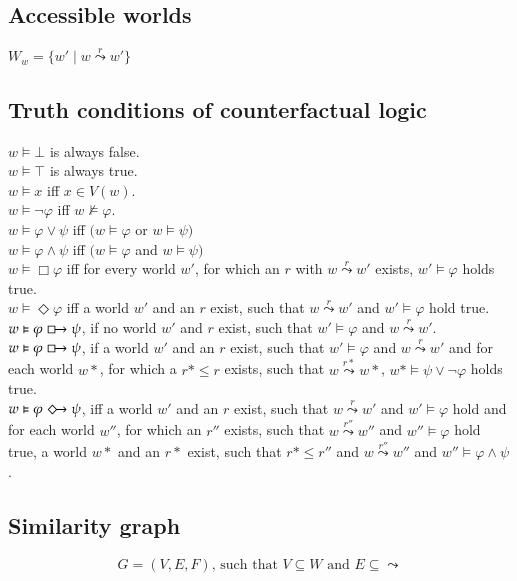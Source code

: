 \documentclass[a4paper,american]{paper}
\begin{document}
\subsection{Accessible worlds}
$W_w = \{w'\mid w \overset{r}{\leadsto} w'\}$

\newpage
\subsection{Truth conditions of counterfactual logic}
$w \vDash \bot$ is always false. \\
$w \vDash \top$ is always true. \\
$w \vDash x$ iff $x \in V(w)$. \\
$w \vDash \neg \varphi$ iff $w \nvDash \varphi$. \\
$w \vDash \varphi \vee \psi$ iff $(w \vDash \varphi$ or $w \vDash \psi)$ \\
$w \vDash \varphi \wedge \psi$ iff $(w \vDash \varphi$ and $w \vDash \psi)$ \\
$w \vDash \Box \varphi$ iff for every world $w'$, for which an $r$ with $w\overset{r}{\leadsto} w'$ exists, $w' \vDash \varphi$ holds true. \\
$w \vDash \Diamond \varphi$ iff a world $w'$ and an $r$ exist, such that $w\overset{r}{\leadsto} w'$ and $w' \vDash \varphi$ hold true. \\
$w \vDash \varphi \boxright \psi$, if no world $w'$ and $r$ exist, such that $w' \vDash \varphi$ and $w\overset{r}{\leadsto} w'$. \\
$w \vDash \varphi \boxright \psi$, if a world $w'$ and an $r$ exist, such that $w'\vDash \varphi$ and $w\overset{r}{\leadsto} w'$ and for each world $w*$, for which a $r*\leq r$ exists, such that $w\overset{r*}{\leadsto} w*$, $w*\vDash\psi\vee\neg\varphi$ holds true. \\
$w \vDash \varphi \Diamondright \psi$, iff a world $w'$ and an $r$ exist, such that $w\overset{r}{\leadsto} w'$ and $w' \vDash \varphi$ hold and for each world $w''$, for which an $r''$ exists, such that $w\overset{r''}{\leadsto}w''$ and $w'' \vDash \varphi$ hold true, a world $w*$ and an $r*$ exist, such that $r* \leq r''$ and $w\overset{r''}{\leadsto}w''$ and $w'' \vDash \varphi \wedge \psi$.
\subsection{Similarity graph}
\begin{equation}
	G = (V,E,F)\text{, such that }V \subseteq W\text{ and }E \subseteq \leadsto
\end{equation}
\end{document}
